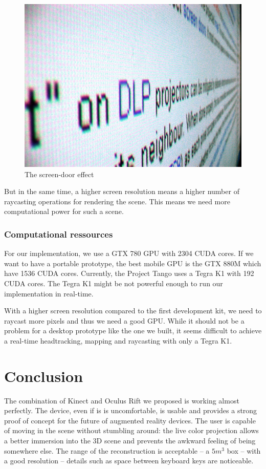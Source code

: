 \documentclass[12pt, twoside]{article}
\let\oldsection\section
\def\section{\cleardoublepage\oldsection}
\begin{document}
\begin{figure}[!h]
  \centering
  \includegraphics[scale=0.1]{Screen-door_effect.jpg}
  \caption{\label{fig:sdeffect} The screen-door effect}
\end{figure}

But in the same time, a higher screen resolution means a higher number of raycasting operations for rendering the scene. This means we need more computational power for such a scene.

\subsubsection{Computational ressources}
For our implementation, we use a GTX 780 GPU with 2304 CUDA cores. If we want to have a portable prototype, the best mobile GPU is the GTX 880M which have 1536 CUDA cores. Currently, the Project Tango uses a Tegra K1 with 192 CUDA cores. The Tegra K1 might be not powerful enough to run our implementation in real-time.

With a higher screen resolution compared to the first development kit, we need to raycast more pixels and thus we need a good GPU. While it should not be a problem for a desktop prototype like the one we built, it seems difficult to achieve a real-time headtracking, mapping and raycasting with only a Tegra K1.

\newpage
\section*{Conclusion}
The combination of Kinect and Oculus Rift we proposed is working almost perfectly. The device, even if is is uncomfortable, is usable and provides a strong proof of concept for the future of augmented reality devices. The user is capable of moving in the scene without stumbling around: the live color projection allows a better immersion into the 3D scene and prevents the awkward feeling of being somewhere else. The range of the reconstruction is acceptable -- a $5m^3$ box -- with a good resolution -- details such as space between keyboard keys are noticeable.
\end{document}
